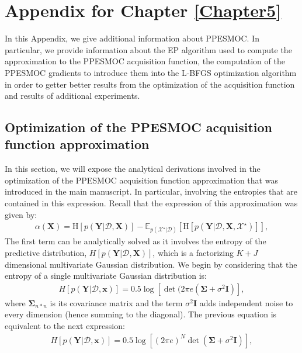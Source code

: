 
\chapter{Appendix for Chapter \ref{Chapter5}}
\label{AppendixC}

In this Appendix, we give additional information about PPESMOC. In particular, we provide information about the EP algorithm used to compute the approximation to the PPESMOC acquisition function, the computation of the PPESMOC gradients to introduce them into the L-BFGS optimization algorithm in order to getter better results from the optimization of the acquisition function and results of additional experiments.

\section{Optimization of the PPESMOC acquisition function approximation}
In this section, we will expose the analytical derivations involved in the optimization of the PPESMOC acquisition function approximation that was introduced in the main manuscript. In particular, involving the entropies that are contained in this expression. Recall that the expression of this approximation was given by:
\begin{align}
\alpha(\mathbf{X}) = \text{H}[p(\mathbf{Y}|\mathcal{D},\mathbf{X})] - 
	\mathbb{E}_{p(\mathcal{X}^\star|\mathcal{D})}[\text{H}[p(\mathbf{Y}|\mathcal{D},\mathbf{X},\mathcal{X}^\star)]],
\label{eq:acq_simplified}
\end{align}
The first term can be analytically solved as it involves the entropy of the predictive distribution, $H[p(\mathbf{Y}|\mathcal{D},\mathbf{X})]$, which is a factorizing $K+J$ dimensional multivariate Gaussian distribution. We begin by considering that the entropy of a single multivariate Gaussian distribution is:
\begin{align}
H[p(\mathbf{Y}|\mathcal{D},\mathbf{x})] = 0.5\log[\det(2\pi e(\mathbf{\Sigma}+\sigma^2\mathbf{I})],
\end{align}
where $\mathbf{\Sigma}_{n*n}$ is its covariance matrix and the term $\sigma^2\mathbf{I}$ adds independent noise to every dimension (hence summing to the diagonal). The previous equation is equivalent to the next expression:
\begin{align}
H[p(\mathbf{Y}|\mathcal{D},\mathbf{x})] = 0.5\log[(2\pi e)^{N}\det(\mathbf{\Sigma}+\sigma^2\mathbf{I})],
\end{align}

